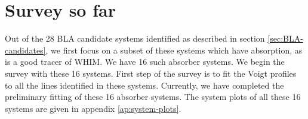 \section{Survey so far} \label{sec:OVI-BLA}

Out of the 28 BLA candidate systems identified as described in section \ref{sec:BLA-candidates}, we first focus on a subset of these systems which have  absorption, as  is a good tracer of WHIM. We have 16 such absorber systems. We begin the survey with these 16 systems. First step of the survey is to fit the Voigt profiles to all the lines identified in these systems. Currently, we have completed the preliminary fitting of these 16 absorber systems. The system plots of all these 16 systems are given in appendix \ref{ap:system-plots}.

